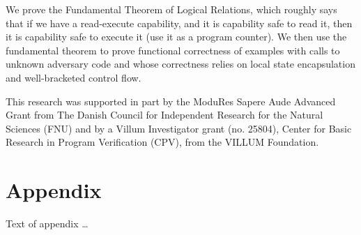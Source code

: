 \documentclass[sigplan,review]{acmart}\settopmatter{printfolios=true,printccs=false,printacmref=false}
\begin{document}



We prove the Fundamental Theorem of Logical Relations, which roughly says that if we have a read-execute capability, and it is capability safe to read it, then it is capability safe to execute it (use it as a program counter).
We then use the fundamental theorem to prove functional correctness of examples with calls to unknown adversary code and whose correctness relies on local state encapsulation and well-bracketed control flow.

\begin{acks}                            %

  This research was supported in part by the ModuRes Sapere Aude Advanced Grant from The Danish Council for Independent Research for the Natural Sciences (FNU) and by a Villum Investigator grant (no.
  25804), Center for Basic Research in Program Verification (CPV), from the VILLUM Foundation.
  
\end{acks}





\appendix
\section{Appendix}

Text of appendix \ldots
\end{document}
